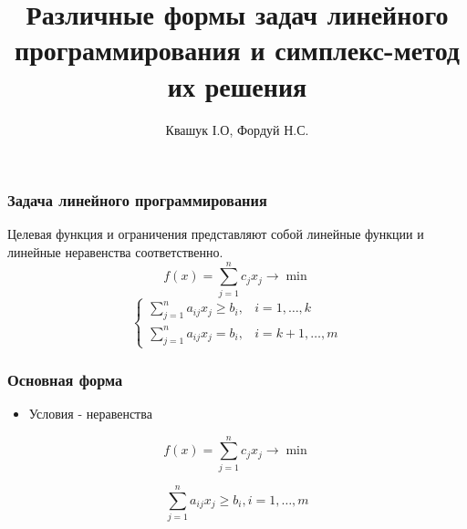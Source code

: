 \documentclass[12pt]{beamer}
\begin{document}
	\author{Квашук І.О, Фордуй Н.С.}
	\title{Различные формы задач линейного программирования и
	 симплекс-метод их решения}
	\begin{frame}[plain]
		\begin{titlepage}
		\end{titlepage}
	\end{frame}
	\begin{frame}
	\frametitle{Задача линейного программирования}
	Целевая функция и ограничения представляют собой линейные функции и линейные неравенства соответственно. 
	\begin{equation*}
		f(x)=\sum_{j=1}^n c_j x_j \to \min
	\end{equation*}
	\begin{equation*}
		\begin{cases}	
			\sum_{j=1}^n a_{ij} x_j \geq b_i, &  i=1,\dots, k\\
			\sum_{j=1}^n a_{ij} x_j= b_i, & i=k+1,\dots,m
		\end{cases}
	\end{equation*}
	\end{frame}
	\begin{frame}
	\frametitle{Основная форма}
	\begin{itemize}
	\item Условия - неравенства 
\end{itemize}
	\begin{equation*}
		f(x)=\sum_{j=1}^n c_j x_j \to \min
	\end{equation*}
	
	\begin{equation*}
			\sum_{j=1}^n a_{ij} x_j \geq b_i, i=1,\dots, m
	\end{equation*}
\end{frame}
\end{document}
